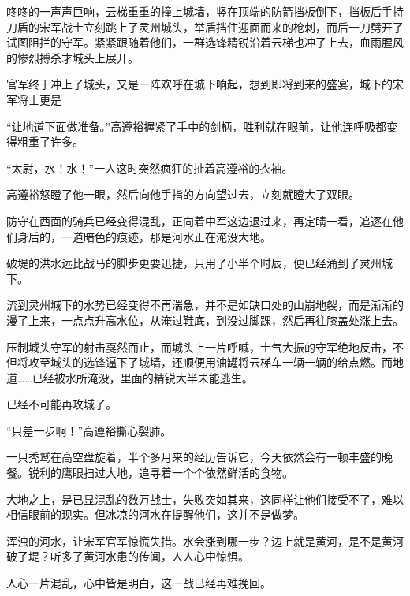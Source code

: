 咚咚的一声声巨响，云梯重重的撞上城墙，竖在顶端的防箭挡板倒下，挡板后手持刀盾的宋军战士立刻跳上了灵州城头，举盾挡住迎面而来的枪刺，而后一刀劈开了试图阻拦的守军。紧紧跟随着他们，一群选锋精锐沿着云梯也冲了上去，血雨腥风的惨烈搏杀才城头上展开。

官军终于冲上了城头，又是一阵欢呼在城下响起，想到即将到来的盛宴，城下的宋军将士更是

“让地道下面做准备。”高遵裕握紧了手中的剑柄，胜利就在眼前，让他连呼吸都变得粗重了许多。

“太尉，水！水！”一人这时突然疯狂的扯着高遵裕的衣袖。

高遵裕怒瞪了他一眼，然后向他手指的方向望过去，立刻就瞪大了双眼。

防守在西面的骑兵已经变得混乱，正向着中军这边退过来，再定睛一看，追逐在他们身后的，一道暗色的痕迹，那是河水正在淹没大地。

破堤的洪水远比战马的脚步更要迅捷，只用了小半个时辰，便已经涌到了灵州城下。

流到灵州城下的水势已经变得不再湍急，并不是如缺口处的山崩地裂，而是渐渐的漫了上来，一点点升高水位，从淹过鞋底，到没过脚踝，然后再往膝盖处涨上去。

压制城头守军的射击戛然而止，而城头上一片呼喊，士气大振的守军绝地反击，不但将攻至城头的选锋逼下了城墙，还顺便用油罐将云梯车一辆一辆的给点燃。而地道……已经被水所淹没，里面的精锐大半未能逃生。

已经不可能再攻城了。

“只差一步啊！”高遵裕撕心裂肺。

一只秃鹫在高空盘旋着，半个多月来的经历告诉它，今天依然会有一顿丰盛的晚餐。锐利的鹰眼扫过大地，追寻着一个个依然鲜活的食物。

大地之上，是已显混乱的数万战士，失败突如其来，这同样让他们接受不了，难以相信眼前的现实。但冰凉的河水在提醒他们，这并不是做梦。

浑浊的河水，让宋军官军惊慌失措。水会涨到哪一步？边上就是黄河，是不是黄河破了堤？听多了黄河水患的传闻，人人心中惊惧。

人心一片混乱，心中皆是明白，这一战已经再难挽回。

